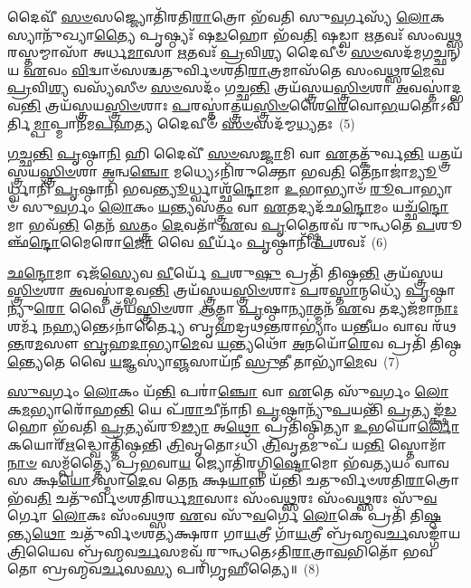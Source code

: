 𑌦𑍈𑌵𑍀᳴ \ul{𑌸}\-\-\ul{𑍞}\-𑌸𑌜𑍍𑌜𑍍𑌯𑍋𑌤𑌿᳴𑌰𑌤𑌿\-\ul{𑌰𑌾}\-𑌤𑍍𑌰𑍋 𑌭᳴𑌵𑌤𑌿 𑌸𑍁\-\ul{𑌵}\-𑌰𑍍𑌗𑌸𑍍𑌯᳴ \ul{𑌲𑍋}\-𑌕𑌸𑍍𑌯𑌾𑌨𑍁᳴𑌖𑍍𑌯𑌾\-\ul{𑌤𑍍𑌯𑍈} 𑌪𑍃𑌷𑍍𑌠𑍍𑌯𑌃᳴ 𑌷\-\ul{𑌡}\-𑌹𑍋 𑌭᳴𑌵\-\ul{𑌤𑌿} 𑌷𑌡𑍍𑌵𑌾 \ul{𑌋}\-𑌤𑌵𑌃᳴ 𑌸𑌂𑌵\-\ul{𑌥𑍍𑌸}\-𑌰𑌸𑍍𑌤𑌮𑍍𑌮𑌾𑌸𑌾᳴ 𑌅𑌰𑍍𑌧\-\ul{𑌮𑌾}\-𑌸𑌾 \ul{𑌋}\-𑌤𑌵𑌃᳴ \ul{𑌪𑍍𑌰}\-𑌵𑌿\-\ul{𑌶𑍍𑌯} 𑌦𑍈𑌵𑍀𑍞᳴ \ul{𑌸}\-\-\ul{𑍞}\-𑌸𑌦᳴𑌮𑌗\-\ul{𑌚𑍍𑌛}\-𑌨𑍍 𑌯 \ul{𑌏}\-𑌵𑌂 \ul{𑌵𑌿}\-𑌦𑍍𑌵𑌾𑍞᳴𑌸𑌶𑍍𑌚𑌤𑍁𑌰𑍍𑌵𑌿𑍞𑌶𑌤𑌿\-\ul{𑌰𑌾}\-𑌤𑍍𑌰𑌮𑌾𑌸᳴𑌤𑍇 𑌸𑌂𑌵\-\ul{𑌥𑍍𑌸}\-𑌰\-\ul{𑌮𑍇}\-𑌵 \ul{𑌪𑍍𑌰}\-𑌵𑌿\-\ul{𑌶𑍍𑌯} 𑌵𑌸𑍍𑌯᳴𑌸𑍀𑍞 \ul{𑌸}\-\-\ul{𑍞}\-𑌸𑌦𑌂᳴ 𑌗𑌚𑍍𑌛\-\ul{𑌨𑍍𑌤𑌿} 𑌤𑍍𑌰𑌯᳴𑌸𑍍𑌤𑍍𑌰𑌯\-\ul{𑌸𑍍𑌤𑍍𑌰𑌿}\-\-\ul{𑍞}\-𑌶𑌾 \ul{𑌅}\-𑌵𑌸𑍍𑌤𑌾॑𑌦𑍍𑌭𑌵\-\ul{𑌨𑍍𑌤𑌿} 𑌤𑍍𑌰𑌯᳴𑌸𑍍𑌤𑍍𑌰𑌯\-\ul{𑌸𑍍𑌤𑍍𑌰𑌿}\-\-\ul{𑍞}\-𑌶𑌾𑌃 \ul{𑌪}\-𑌰𑌸𑍍𑌤𑌾॑𑌤𑍍𑌤𑍍𑌰𑌯\-\ul{𑌸𑍍𑌤𑍍𑌰𑌿}\-\-\ul{𑍞}\-𑌶𑍈\-\ul{𑌰𑍇}\-𑌵𑍋\-\ul{𑌭}\-𑌯𑌤𑍋\-𑌽𑌵᳴𑌰𑍍𑌤𑌿\-\ul{𑌮𑍍𑌪𑌾}\-𑌪𑍍𑌮𑌾𑌨᳴𑌮\-\ul{𑌪}\-𑌹\-\ul{𑌤𑍍𑌯} 𑌦𑍈𑌵𑍀𑍞᳴ \ul{𑌸}\-\-\ul{𑍞}\-𑌸𑌦᳴𑌮𑍍𑌮\-\ul{𑌧𑍍𑌯}\-𑌤𑌃~(5)

\-\ul{𑌗}\-\-\ul{𑌚𑍍𑌛}\-\-\ul{𑌨𑍍𑌤𑌿} \ul{𑌪𑍃}\-𑌷𑍍𑌠𑌾\-\ul{𑌨𑌿} 𑌹𑌿 𑌦𑍈𑌵𑍀᳴ \ul{𑌸}\-\-\ul{𑍞}\-𑌸\-\ul{𑌜𑍍𑌜𑌾}\-𑌮𑌿 𑌵𑌾 \ul{𑌏}\-𑌤𑌤𑍍𑌕𑍁᳴𑌰𑍍𑌵\-\ul{𑌨𑍍𑌤𑌿} 𑌯𑌤𑍍𑌤𑍍𑌰𑌯᳴𑌸𑍍𑌤𑍍𑌰𑌯\-\ul{𑌸𑍍𑌤𑍍𑌰𑌿}\-\-\ul{𑍞}\-𑌶𑌾 \ul{𑌅}\-𑌨𑍍𑌵\-\ul{𑌞𑍍𑌚𑍋} 𑌮𑌧𑍍𑌯𑍇\-𑌽𑌨𑌿᳴𑌰𑍁𑌕𑍍𑌤𑍋 𑌭𑌵\-\ul{𑌤𑌿} 𑌤𑍇𑌨𑌾𑌜𑌾॑\-\ul{𑌮𑍍𑌯𑍂}\-𑌰𑍍𑌧𑍍𑌵𑌾𑌨𑌿᳴ \ul{𑌪𑍃}\-𑌷𑍍𑌠𑌾𑌨𑌿᳴ 𑌭𑌵\-\ul{𑌨𑍍𑌤𑍍𑌯𑍂}\-𑌰𑍍𑌧𑍍𑌵𑌾𑌶𑍍𑌛᳴\-\ul{𑌨𑍍𑌦𑍋}\-𑌮𑌾 \ul{𑌉}\-𑌭𑌾𑌭𑍍𑌯𑌾𑍞᳴ \ul{𑌰𑍂}\-𑌪𑌾𑌭𑍍𑌯𑌾𑍞᳴ 𑌸𑍁\-\ul{𑌵}\-𑌰𑍍𑌗𑌂 \ul{𑌲𑍋}\-𑌕𑌂 \ul{𑌯}\-𑌨𑍍𑌤𑍍𑌯𑌸᳴\-\ul{𑌤𑍍𑌤𑍍𑌰𑌂} 𑌵𑌾 \ul{𑌏}\-𑌤𑌦𑍍𑌯𑌦᳴𑌛\-\ul{𑌨𑍍𑌦𑍋}\-𑌮𑌂 𑌯𑌚𑍍𑌛᳴\-\ul{𑌨𑍍𑌦𑍋}\-𑌮𑌾 𑌭𑌵᳴\-\ul{𑌨𑍍𑌤𑌿} 𑌤𑍇𑌨᳴ \ul{𑌸}\-𑌤𑍍𑌤𑍍𑌰𑌂 \ul{𑌦𑍇}\-𑌵𑌤𑌾᳴ \ul{𑌏}\-𑌵 \ul{𑌪𑍃}\-𑌤𑍍𑌷𑍍𑌠𑍈𑌰𑌵᳴ 𑌰𑍁𑌨𑍍𑌧𑌤𑍇 \ul{𑌪}\-𑌶𑍂𑌞𑍍𑌛᳴\-\ul{𑌨𑍍𑌦𑍋}\-𑌮𑍈𑌰𑍋\-\ul{𑌜𑍋} 𑌵𑍈 \ul{𑌵𑍀}\-𑌰𑍍𑌯𑌂᳴ \ul{𑌪𑍃}\-𑌷𑍍𑌠𑌾𑌨𑌿᳴ \ul{𑌪}\-𑌶𑌵𑌃᳴~(6)

\-\ul{𑌛}\-\-\ul{𑌨𑍍𑌦𑍋}\-𑌮𑌾 𑌓𑌜᳴\-\ul{𑌸𑍍𑌯𑍇}\-𑌵 \ul{𑌵𑍀}\-𑌰𑍍𑌯𑍇᳴ \ul{𑌪}\-𑌶𑍁\-\ul{𑌷𑍁} 𑌪𑍍𑌰𑌤𑌿᳴ 𑌤𑌿𑌷𑍍𑌠\-\ul{𑌨𑍍𑌤𑌿} 𑌤𑍍𑌰𑌯᳴𑌸𑍍𑌤𑍍𑌰𑌯\-\ul{𑌸𑍍𑌤𑍍𑌰𑌿}\-\-\ul{𑍞}\-𑌶𑌾 \ul{𑌅}\-𑌵𑌸𑍍𑌤𑌾॑𑌦𑍍𑌭𑌵\-\ul{𑌨𑍍𑌤𑌿} 𑌤𑍍𑌰𑌯᳴𑌸𑍍𑌤𑍍𑌰𑌯\-\ul{𑌸𑍍𑌤𑍍𑌰𑌿}\-\-\ul{𑍞}\-𑌶𑌾𑌃 \ul{𑌪}\-𑌰\-\ul{𑌸𑍍𑌤𑌾}\-𑌨𑍍𑌮𑌧𑍍𑌯𑍇᳴ \ul{𑌪𑍃}\-𑌷𑍍𑌠𑌾𑌨𑍍𑌯𑍁\-\ul{𑌰𑍋} 𑌵𑍈 𑌤𑍍𑌰᳴𑌯\-\ul{𑌸𑍍𑌤𑍍𑌰𑌿}\-\-\ul{𑍞}\-𑌶𑌾 \ul{𑌆}\-𑌤𑍍𑌮𑌾 \ul{𑌪𑍃}\-𑌷𑍍𑌠𑌾\-\ul{𑌨𑍍𑌯𑌾}\-𑌤𑍍𑌮𑌨᳴ \ul{𑌏}\-𑌵 𑌤𑌦𑍍𑌯𑌜᳴𑌮𑌾\-\ul{𑌨𑌾𑌃} 𑌶𑌰𑍍𑌮᳴ 𑌨\-\ul{𑌹𑍍𑌯}\-𑌨𑍍𑌤𑍇\-𑌽𑌨𑌾॑𑌰𑍍𑌤𑍍𑌯𑍈 𑌬𑍃𑌹𑌦𑍍𑌰𑌥\-\ul{𑌨𑍍𑌤}\-𑌰𑌾\-𑌭𑍍𑌯𑌾𑌂॑ 𑌯\-\ul{𑌨𑍍𑌤𑍀}\-𑌯𑌂 𑌵𑌾𑌵 𑌰᳴𑌥\-\ul{𑌨𑍍𑌤}\-𑌰\-\ul{𑌮}\-𑌸𑍗 \ul{𑌬𑍃}\-𑌹\-\ul{𑌦𑌾}\-𑌭𑍍𑌯𑌾\-\ul{𑌮𑍇}\-𑌵 \ul{𑌯}\-𑌨𑍍𑌤𑍍𑌯𑌥𑍋᳴ \ul{𑌅}\-𑌨𑌯𑍋᳴\-\ul{𑌰𑍇}\-𑌵 𑌪𑍍𑌰𑌤𑌿᳴ 𑌤𑌿𑌷𑍍𑌠\-\ul{𑌨𑍍𑌤𑍍𑌯𑍇}\-𑌤𑍇 𑌵𑍈 \ul{𑌯}\-𑌜𑍍𑌞𑌸𑍍𑌯𑌾॑\-\ul{𑌞𑍍𑌜}\-𑌸𑌾𑌯᳴𑌨𑍀 \ul{𑌸𑍍𑌰𑍁}\-𑌤𑍀 𑌤𑌾𑌭𑍍𑌯𑌾᳴\-\ul{𑌮𑍇}\-𑌵~(7)

\-\ul{𑌸𑍁}\-\-\ul{𑌵}\-𑌰𑍍𑌗𑌂 \ul{𑌲𑍋}\-𑌕𑌂 𑌯᳴\-\ul{𑌨𑍍𑌤𑌿} 𑌪𑌰𑌾॑\-\ul{𑌞𑍍𑌚𑍋} 𑌵𑌾 \ul{𑌏}\-𑌤𑍇 𑌸𑍁᳴\-\ul{𑌵}\-𑌰𑍍𑌗𑌂 \ul{𑌲𑍋}\-𑌕\-\ul{𑌮}\-𑌭𑍍𑌯𑌾𑌰𑍋᳴𑌹\-\ul{𑌨𑍍𑌤𑌿} 𑌯𑍇 𑌪᳴\-\ul{𑌰𑌾}\-𑌚𑍀𑌨𑌾᳴𑌨𑌿 \ul{𑌪𑍃}\-𑌷𑍍𑌠𑌾𑌨𑍍𑌯𑍁᳴\-\ul{𑌪}\-𑌯𑌨𑍍𑌤𑌿᳴ \ul{𑌪𑍍𑌰}\-𑌤𑍍𑌯𑌙𑍍𑌕𑍍𑌷᳴\-\ul{𑌡}\-𑌹𑍋 𑌭᳴𑌵𑌤𑌿 \ul{𑌪𑍍𑌰}\-𑌤𑍍𑌯𑌵᳴𑌰𑍂\-\ul{𑌢𑍍𑌯𑌾} 𑌅\-\ul{𑌥𑍋} 𑌪𑍍𑌰𑌤𑌿᳴𑌷𑍍𑌠𑌿𑌤𑍍𑌯𑌾 \ul{𑌉}\-𑌭𑌯𑍋॑\-\ul{𑌰𑍍𑌲𑍋}\-𑌕𑌯𑍋𑌰𑍍\mbox{}᳴\-\ul{𑌋}\-𑌦𑍍𑌧𑍍𑌵𑍋𑌤𑍍𑌤𑌿᳴𑌷𑍍𑌠𑌨𑍍𑌤𑌿 \ul{𑌤𑍍𑌰𑌿}\-𑌵𑍃𑌤𑍋\-𑌽𑌧𑌿᳴ \ul{𑌤𑍍𑌰𑌿}\-𑌵𑍃\-\ul{𑌤}\-𑌮𑍁𑌪᳴ 𑌯\-\ul{𑌨𑍍𑌤𑌿} 𑌸𑍍𑌤𑍋𑌮𑌾᳴\-\ul{𑌨𑌾}\-\-\ul{𑍞} 𑌸𑌮𑍍𑌪᳴𑌤𑍍𑌤𑍍𑌯𑍈 𑌪𑍍𑌰\-\ul{𑌭}\-𑌵𑌾\-\ul{𑌯} 𑌜𑍍𑌯𑍋𑌤𑌿᳴𑌰𑌗𑍍𑌨𑌿\-\ul{𑌷𑍍𑌟𑍋}\-𑌮𑍋 𑌭᳴𑌵\-\ul{𑌤𑍍𑌯}\-𑌯𑌂 𑌵𑌾𑌵 𑌸 𑌕𑍍𑌷\-\ul{𑌯𑍋}\-\-𑌽𑌸𑍍𑌮𑌾\-\ul{𑌦𑍇}\-𑌵 𑌤𑍇\-\ul{𑌨} 𑌕𑍍𑌷\-\ul{𑌯𑌾}\-𑌨𑍍𑌨 𑌯᳴𑌨𑍍𑌤𑌿 𑌚𑌤𑍁𑌰𑍍𑌵𑌿𑍞𑌶𑌤𑌿\-\ul{𑌰𑌾}\-𑌤𑍍𑌰𑍋 𑌭᳴𑌵\-\ul{𑌤𑌿} 𑌚𑌤𑍁᳴𑌰𑍍𑌵𑌿𑍞𑌶𑌤𑌿𑌰𑌰𑍍𑌧\-\ul{𑌮𑌾}\-𑌸𑌾𑌃 𑌸𑌂᳴𑌵\-\ul{𑌥𑍍𑌸}\-𑌰𑌃 𑌸𑌂᳴𑌵\-\ul{𑌥𑍍𑌸}\-𑌰𑌃 𑌸𑍁᳴\-\ul{𑌵}\-𑌰𑍍𑌗𑍋 \ul{𑌲𑍋}\-𑌕𑌃 𑌸𑌂᳴𑌵\-\ul{𑌥𑍍𑌸}\-𑌰 \ul{𑌏}\-𑌵 𑌸𑍁᳴\-\ul{𑌵}\-𑌰𑍍𑌗𑍇 \ul{𑌲𑍋}\-𑌕𑍇 𑌪𑍍𑌰𑌤𑌿᳴ 𑌤𑌿\-\ul{𑌷𑍍𑌠}\-𑌨𑍍𑌤𑍍𑌯\-\ul{𑌥𑍋} 𑌚𑌤𑍁᳴𑌰𑍍𑌵𑌿𑍞𑌶𑌤𑍍𑌯𑌕𑍍𑌷𑌰𑌾 𑌗𑌾\-\ul{𑌯}\-𑌤𑍍𑌰𑍀 𑌗𑌾᳴\-\ul{𑌯}\-𑌤𑍍𑌰𑍀 𑌬𑍍𑌰᳴𑌹𑍍𑌮𑌵\-\ul{𑌰𑍍𑌚}\-𑌸𑌙𑍍𑌗𑌾᳴𑌯\-\ul{𑌤𑍍𑌰𑌿}\-𑌯𑍈𑌵 𑌬𑍍𑌰᳴𑌹𑍍𑌮𑌵\-\ul{𑌰𑍍𑌚}\-𑌸𑌮𑌵᳴ 𑌰𑍁𑌨𑍍𑌧𑌤𑍇\-𑌽𑌤𑌿\-\ul{𑌰𑌾}\-𑌤𑍍𑌰𑌾\-\ul{𑌵}\-𑌭𑌿𑌤𑍋᳴ 𑌭𑌵𑌤𑍋 𑌬𑍍𑌰𑌹𑍍𑌮𑌵\-\ul{𑌰𑍍𑌚}\-𑌸\-\ul{𑌸𑍍𑌯} 𑌪𑌰𑌿᳴𑌗𑍃𑌹𑍀𑌤𑍍𑌯𑍈॥~(8)

